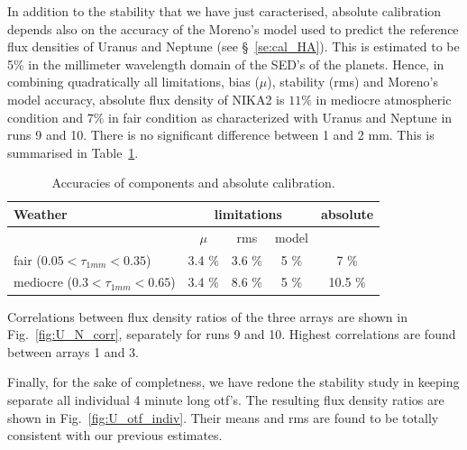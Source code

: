 In addition to the stability that we
have just caracterised, absolute calibration depends also on the
accuracy of the Moreno's model used to  predict the reference flux
densities of Uranus and Neptune (see \S~\ref{se:cal_HA}).    
This  is estimated to be 5\% in the millimeter wavelength domain of the SED's of the planets.
Hence, in combining quadratically all limitations, bias ($\mu$), stability (rms) and  Moreno's model accuracy, absolute flux density
of NIKA2 is $11\%$ in mediocre atmospheric
condition and  $7\%$ in fair condition as characterized with Uranus
and Neptune in runs 9 and 10. There is no significant difference
between 1 and 2 mm. This is summarised in Table~\ref{tab:cal_tot}.



\begin{table}[h]
\begin{center}
\begin{tabular}{|l|c|c|c|c|}
\hline
Weather  & \multicolumn{3}{|c|}{limitations} & absolute  \\
\hline
                &    $\mu$       &   rms   &    model  &    \\
\hline
 fair  ($0.05 < \tau_{1mm} < 0.35$)                      &       3.4 \%    &      3.6 \%   &    5 \%       &   7 \%    \\
 mediocre     ($0.3 < \tau_{1mm} < 0.65$)              &       3.4 \%    &      8.6 \%   &    5 \%      &  10.5 \%    \\
\hline
\end{tabular}
\caption[]{Accuracies of components and absolute calibration.}
\label{tab:cal_tot}
\end{center}
\end{table}


Correlations between flux density ratios of the three arrays are shown in Fig.~\ref{fig:U_N_corr}, separately
for runs 9 and  10. Highest correlations are found between arrays 1 and 3.

Finally, for the sake of completness, we have redone the stability study
in keeping separate all individual 4 minute long otf's.
The resulting flux density ratios are shown in Fig.~\ref{fig:U_otf_indiv}.
Their means and rms are found to be totally consistent with our previous estimates.


